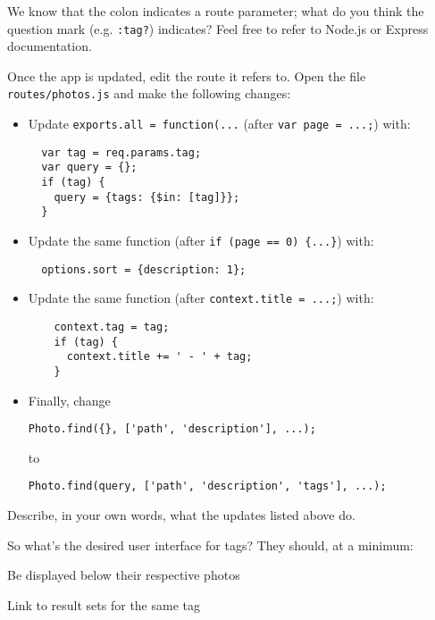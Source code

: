 \documentclass{article}
\begin{document}
 We know that the colon indicates a route parameter; what do you think the question mark (e.g. \verb!:tag?!) indicates? Feel free to refer to Node.js or Express documentation.

Once the app is updated, edit the route it refers to. Open the file \verb!routes/photos.js! and make the following changes:

\begin{itemize}
\item Update \verb!exports.all = function(...! (after \verb!var page = ...;!) with:
\begin{verbatim}
  var tag = req.params.tag;
  var query = {};
  if (tag) {
    query = {tags: {$in: [tag]}};
  }
\end{verbatim}

\item Update the same function (after \verb!if (page == 0) {...}!) with:

\begin{verbatim}
  options.sort = {description: 1};
\end{verbatim}

\item Update the same function (after \verb!context.title = ...;!) with:

\begin{verbatim}
    context.tag = tag;
    if (tag) {
      context.title += ' - ' + tag;
    }
\end{verbatim}

\item Finally, change
\begin{verbatim}
Photo.find({}, ['path', 'description'], ...);
\end{verbatim}
to
\begin{verbatim}
Photo.find(query, ['path', 'description', 'tags'], ...);
\end{verbatim}
\end{itemize}

 Describe, in your own words, what the updates listed above do.


So what's the desired user interface for tags? They should, at a minimum:

\begin{itemize*}
\item Be displayed below their respective photos
\item Link to result sets for the same tag
\end{itemize*}
\end{document}
